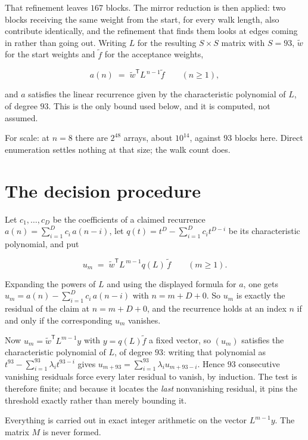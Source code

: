 \documentclass[11pt]{article}
\theoremstyle{definition}
\begin{document}
That refinement leaves $167$ blocks. The mirror reduction is then applied: two blocks receiving the same weight from the start, for every walk length, also contribute identically, and the refinement that finds them looks at edges coming in rather than going out. Writing $L$ for the resulting $S \times S$ matrix with $S = 93$, $\tilde w$ for the start weights and $\tilde f$ for the acceptance weights,

\[a(n) \;=\; \tilde w^{\mathsf T} L^{\,n-1} \tilde f \qquad (n \ge 1),\]

and $a$ satisfies the linear recurrence given by the characteristic polynomial of $L$, of degree $93$. This is the only bound used below, and it is computed, not assumed.

For scale: at $n = 8$ there are $2^{48}$ arrays, about $10^{14}$, against $93$ blocks here. Direct enumeration settles nothing at that size; the walk count does.

\section{The decision procedure}

Let $c_1,\dots,c_D$ be the coefficients of a claimed recurrence $a(n) = \sum_{i=1}^{D} c_i\,a(n-i)$, let $q(t) = t^{D} - \sum_{i=1}^{D} c_i t^{D-i}$ be its characteristic polynomial, and put

\[u_m \;=\; \tilde w^{\mathsf T} L^{\,m-1} q(L)\,\tilde f \qquad (m \ge 1).\]

Expanding the powers of $L$ and using the displayed formula for $a$, one gets $u_m = a(n) - \sum_{i=1}^{D} c_i\,a(n-i)$ with $n = m + D + 0$. So $u_m$ is exactly the residual of the claim at $n = m + D + 0$, and the recurrence holds at an index $n$ if and only if the corresponding $u_m$ vanishes.

Now $u_m = \tilde w^{\mathsf T} L^{m-1} y$ with $y = q(L)\tilde f$ a fixed vector, so $(u_m)$ satisfies the characteristic polynomial of $L$, of degree $93$: writing that polynomial as $t^{93} - \sum_{i=1}^{93} \lambda_i t^{93-i}$ gives $u_{m+93} = \sum_{i=1}^{93} \lambda_i u_{m+93-i}$. Hence $93$ consecutive vanishing residuals force every later residual to vanish, by induction. The test is therefore finite; and because it locates the {\itshape last} nonvanishing residual, it pins the threshold exactly rather than merely bounding it.

Everything is carried out in exact integer arithmetic on the vector $L^{m-1}y$. The matrix $M$ is never formed.
\end{document}
